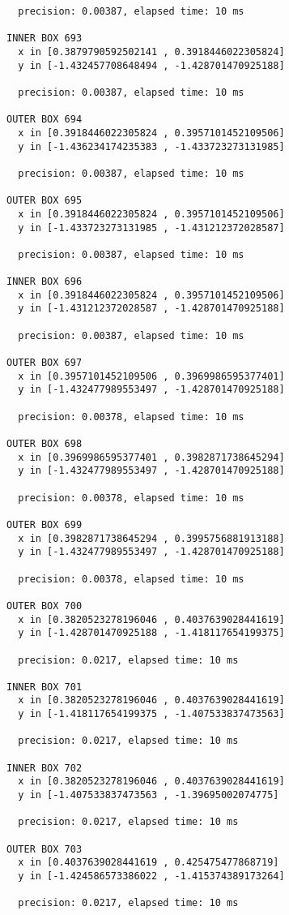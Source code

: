 \begin{verbatim}
  precision: 0.00387, elapsed time: 10 ms

INNER BOX 693
  x in [0.3879790592502141 , 0.3918446022305824]
  y in [-1.432457708648494 , -1.428701470925188]

  precision: 0.00387, elapsed time: 10 ms

OUTER BOX 694
  x in [0.3918446022305824 , 0.3957101452109506]
  y in [-1.436234174235383 , -1.433723273131985]

  precision: 0.00387, elapsed time: 10 ms

OUTER BOX 695
  x in [0.3918446022305824 , 0.3957101452109506]
  y in [-1.433723273131985 , -1.431212372028587]

  precision: 0.00387, elapsed time: 10 ms

INNER BOX 696
  x in [0.3918446022305824 , 0.3957101452109506]
  y in [-1.431212372028587 , -1.428701470925188]

  precision: 0.00387, elapsed time: 10 ms

OUTER BOX 697
  x in [0.3957101452109506 , 0.3969986595377401]
  y in [-1.432477989553497 , -1.428701470925188]

  precision: 0.00378, elapsed time: 10 ms

OUTER BOX 698
  x in [0.3969986595377401 , 0.3982871738645294]
  y in [-1.432477989553497 , -1.428701470925188]

  precision: 0.00378, elapsed time: 10 ms

OUTER BOX 699
  x in [0.3982871738645294 , 0.3995756881913188]
  y in [-1.432477989553497 , -1.428701470925188]

  precision: 0.00378, elapsed time: 10 ms

OUTER BOX 700
  x in [0.3820523278196046 , 0.4037639028441619]
  y in [-1.428701470925188 , -1.418117654199375]

  precision: 0.0217, elapsed time: 10 ms

INNER BOX 701
  x in [0.3820523278196046 , 0.4037639028441619]
  y in [-1.418117654199375 , -1.407533837473563]

  precision: 0.0217, elapsed time: 10 ms

INNER BOX 702
  x in [0.3820523278196046 , 0.4037639028441619]
  y in [-1.407533837473563 , -1.39695002074775]

  precision: 0.0217, elapsed time: 10 ms

OUTER BOX 703
  x in [0.4037639028441619 , 0.425475477868719]
  y in [-1.424586573386022 , -1.415374389173264]

  precision: 0.0217, elapsed time: 10 ms


\end{verbatim}
